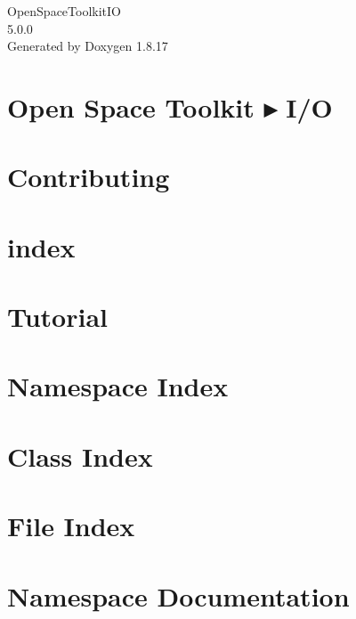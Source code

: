 \let\mypdfximage\pdfximage\def\pdfximage{\immediate\mypdfximage}\documentclass[twoside]{book}
\newcommand{\+}{\discretionary{\mbox{\scriptsize$\hookleftarrow$}}{}{}}
\newcommand{\clearemptydoublepage}{%
  \newpage{\pagestyle{empty}\cleardoublepage}%
}
\begin{document}
\hypersetup{pageanchor=false,
             bookmarksnumbered=true,
             pdfencoding=unicode
            }
\begin{titlepage}
\vspace*{7cm}
\begin{center}%
{\Large Open\+Space\+Toolkit\+IO \\[1ex]\large 5.\+0.\+0 }\\
\vspace*{1cm}
{\large Generated by Doxygen 1.8.17}\\
\end{center}
\end{titlepage}
\clearemptydoublepage
{}
\tableofcontents
\clearemptydoublepage
{}
\hypersetup{pageanchor=true}

\chapter{Open Space Toolkit ▸ I/O}
\label{index}\hypertarget{index}{}
\chapter{Contributing}
\label{md__c_o_n_t_r_i_b_u_t_i_n_g}

\chapter{index}
\label{md_docs_index}

\chapter{Tutorial}
\label{md_docs__tutorial}

\chapter{Namespace Index}

\chapter{Class Index}

\chapter{File Index}

\chapter{Namespace Documentation}






\end{document}

